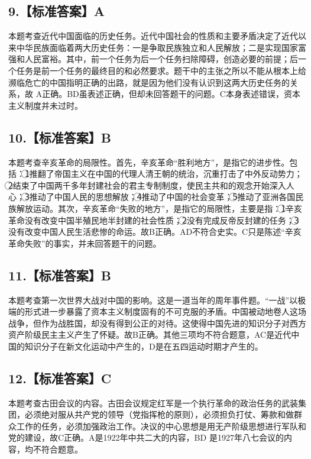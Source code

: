 \documentclass[UTF8,11pt]{ctexart}
\begin{document}
\subsection*{9.【标准答案】A}

本题考查近代中国面临的历史任务。近代中国社会的性质和主要矛盾决定了近代以来中华民族面临着两大历史任务：一是争取民族独立和人民解放；二是实现国家富强和人民富裕。其中，前一个任务为后一个任务扫除障碍，创造必要的前提；后一个任务是前一个任务的最终目的和必然要求。题干中的主张之所以不能从根本上给濒临危亡的中国指明正确的出路，就是因为他们没有认识到这两大历史任务的关系，故 A正确。BD虽表述正确，但却未回答题干的问题。C本身表述错误，资本主义制度并未过时。


\subsection*{10.【标准答案】B}

本题考查辛亥革命的局限性。首先，辛亥革命“胜利地方”，是指它的进步性。包括：\textcircled{1}推翻了帝国主义在中国的代理人清王朝的统治，沉重打击了中外反动势力；\textcircled{2}结束了中国两千多年封建社会的君主专制制度，使民主共和的观念开始深入人心；\textcircled{3}推动了中国人民的思想解放；\textcircled{4}推动了中国的社会变革；\textcircled{5}推动了亚洲各国民族解放运动。其次，辛亥革命“失败的地方”，是指它的局限性，主要是指：\textcircled{1}辛亥革命没有改变中国半殖民地半封建的社会性质；\textcircled{2}没有完成反帝反封建的任务；\textcircled{3}没有改变中国人民生活悲惨的命运。故B正确。AD不符合史实。C只是陈述“辛亥革命失败”的事实，并未回答题干的问题。


\subsection*{11.【标准答案】B}

本题考查第一次世界大战对中国的影响。这是一道当年的周年事件题。“一战”以极端的形式进一步暴露了资本主义制度固有的不可克服的矛盾。中国被动地卷人这场战争，但作为战胜国，却没有得到公正的对待。这使得中国先进的知识分子对西方资产阶级民主主义产生了怀疑。故B正确。其他三项均不符合题意，AC是近代中国的知识分子在新文化运动中产生的，D是在五四运动时期才产生的。


\subsection*{12.【标准答案】C}

本题考查古田会议的内容。古田会议规定红军是一个执行革命的政治任务的武装集团，必须绝对服从共产党的领导（党指挥枪的原则），必须担负打仗、筹款和做群众工作的任务，必须加强政治工作。决议的中心思想是用无产阶级思想进行军队和党的建设，故C正确。A是1922年中共二大的内容，BD 是1927年八七会议的内容，均不符合题意。
\end{document}
